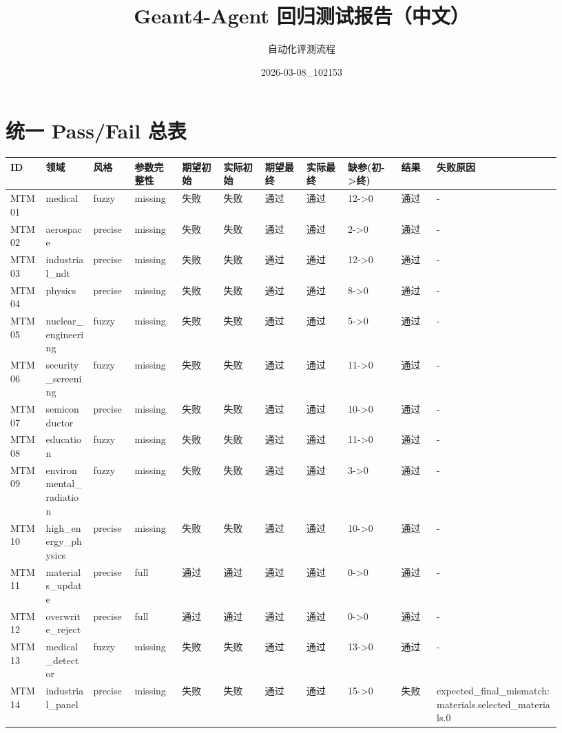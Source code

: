 \documentclass[11pt]{ctexart}
\title{Geant4-Agent 回归测试报告（中文）}
\author{自动化评测流程}
\date{2026-03-08\_102153}
\begin{document}
\maketitle
\section{统一 Pass/Fail 总表}
\begin{longtable}{p{0.06\linewidth}p{0.08\linewidth}p{0.07\linewidth}p{0.08\linewidth}p{0.07\linewidth}p{0.07\linewidth}p{0.07\linewidth}p{0.07\linewidth}p{0.09\linewidth}p{0.06\linewidth}p{0.21\linewidth}}
\toprule
ID & 领域 & 风格 & 参数完整性 & 期望初始 & 实际初始 & 期望最终 & 实际最终 & 缺参(初->终) & 结果 & 失败原因 \\
\midrule
MTM01 & medical & fuzzy & missing & 失败 & 失败 & 通过 & 通过 & 12->0 & 通过 & - \\
MTM02 & aerospace & precise & missing & 失败 & 失败 & 通过 & 通过 & 2->0 & 通过 & - \\
MTM03 & industrial\_ndt & precise & missing & 失败 & 失败 & 通过 & 通过 & 12->0 & 通过 & - \\
MTM04 & physics & precise & missing & 失败 & 失败 & 通过 & 通过 & 8->0 & 通过 & - \\
MTM05 & nuclear\_engineering & fuzzy & missing & 失败 & 失败 & 通过 & 通过 & 5->0 & 通过 & - \\
MTM06 & security\_screening & fuzzy & missing & 失败 & 失败 & 通过 & 通过 & 11->0 & 通过 & - \\
MTM07 & semiconductor & precise & missing & 失败 & 失败 & 通过 & 通过 & 10->0 & 通过 & - \\
MTM08 & education & fuzzy & missing & 失败 & 失败 & 通过 & 通过 & 11->0 & 通过 & - \\
MTM09 & environmental\_radiation & fuzzy & missing & 失败 & 失败 & 通过 & 通过 & 3->0 & 通过 & - \\
MTM10 & high\_energy\_physics & precise & missing & 失败 & 失败 & 通过 & 通过 & 10->0 & 通过 & - \\
MTM11 & materials\_update & precise & full & 通过 & 通过 & 通过 & 通过 & 0->0 & 通过 & - \\
MTM12 & overwrite\_reject & precise & full & 通过 & 通过 & 通过 & 通过 & 0->0 & 通过 & - \\
MTM13 & medical\_detector & fuzzy & missing & 失败 & 失败 & 通过 & 通过 & 13->0 & 通过 & - \\
MTM14 & industrial\_panel & precise & missing & 失败 & 失败 & 通过 & 通过 & 15->0 & 失败 & expected\_final\_mismatch:materials.selected\_materials.0 \\

\end{longtable}
\end{document}
